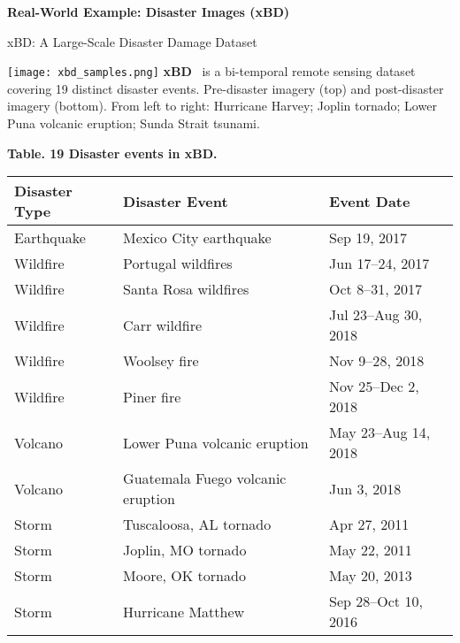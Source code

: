 \begin{frame}
  \centering
  \vspace{2.5cm}
  {\LARGE \textbf{Real-World Example: Disaster Images (xBD)}}
\end{frame}

\begin{refsection}
  \begin{frame}{xBD: A Large-Scale Disaster Damage Dataset}
    \begin{minipage}{0.42\linewidth}
      \centering
      \texttt{[image: xbd\_samples.png]}
      \vspace{0.5em}
      \scriptsize
      \textbf{xBD}~\parencite{guptaCreatingXBDDataset2019} is a bi-temporal remote sensing dataset covering 19 distinct disaster events. Pre-disaster imagery (top) and post-disaster imagery (bottom). From left to right: Hurricane Harvey; Joplin tornado; Lower Puna volcanic eruption; Sunda Strait tsunami.
    \end{minipage}%
    \hfill
    \begin{minipage}{0.55\linewidth}
      \tiny
      \centering
      \textbf{Table. 19 Disaster events in xBD.}
      \begin{tabular}{lll}
        \hline
        \textbf{Disaster Type} & \textbf{Disaster Event} & \textbf{Event Date} \\
        \hline
        Earthquake & Mexico City earthquake & Sep 19, 2017 \\
        Wildfire & Portugal wildfires & Jun 17--24, 2017 \\
        Wildfire & Santa Rosa wildfires & Oct 8--31, 2017 \\
        Wildfire & Carr wildfire & Jul 23--Aug 30, 2018 \\
        Wildfire & Woolsey fire & Nov 9--28, 2018 \\
        Wildfire & Piner fire & Nov 25--Dec 2, 2018 \\
        Volcano & Lower Puna volcanic eruption & May 23--Aug 14, 2018 \\
        Volcano & Guatemala Fuego volcanic eruption & Jun 3, 2018 \\
        Storm & Tuscaloosa, AL tornado & Apr 27, 2011 \\
        Storm & Joplin, MO tornado & May 22, 2011 \\
        Storm & Moore, OK tornado & May 20, 2013 \\
        Storm & Hurricane Matthew & Sep 28--Oct 10, 2016 \\

\end{tabular}
\end{minipage}
\end{frame}
\end{refsection}
